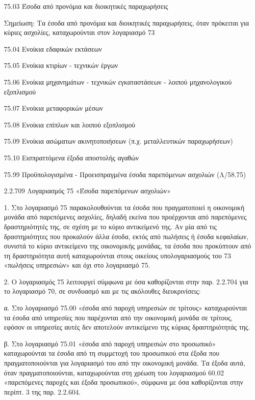 \documentclass[A4,10pt,greek]{book}
\begin{document}
         75.03    Έσοδα από προνόμια και διοικητικές παραχωρήσεις 

                      Σημείωση:  Τα έσοδα από προνόμια και διοικητικές παραχωρήσεις, όταν
                                           πρόκειται για κύριες ασχολίες, καταχωρούνται στον λογαριασμό 73

         75.04    Ενοίκια εδαφικών εκτάσεων 

         75.05    Ενοίκια κτιρίων - τεχνικών έργων 

         75.06    Ενοίκια μηχανημάτων - τεχνικών εγκαταστάσεων - λοιπού
                      μηχανολογικού εξοπλισμού 

         75.07    Ενοίκια μεταφορικών μέσων 

         75.08    Ενοίκια επίπλων και λοιπού εξοπλισμού 

         75.09    Ενοίκια ασώματων ακινητοποιήσεων
                        (π.χ. μεταλλευτικών παραχωρήσεων)

         75.10    Εισπραττόμενα έξοδα αποστολής αγαθών 

         75.99    Προϋπολογισμένα - Προεισπραγμένα έσοδα παρεπόμενων ασχολιών
                        (Λ/58.75)

2.2.709 Λογαριασμός 75 «Έσοδα παρεπόμενων ασχολιών»

1. Στο λογαριασμό 75 παρακολουθούνται τα έσοδα που πραγματοποιεί η οικονομική μονάδα από παρεπόμενες ασχολίες, δηλαδή εκείνα που προέρχονται από παρεπόμενες δραστηριότητές της, σε σχέση με το κύριο αντικείμενό της. Αν μία από τις δραστηριότητες που προκαλούν άλλα έσοδα, εκτός από πωλήσεις ή έσοδα κεφαλαίων, συνιστά το κύριο αντικείμενο της οικονομικής μονάδας, τα έσοδα που προκύπτουν από τη δραστηριότητα αυτή καταχωρούνται στους οικείους υπολογαριασμούς του 73 «πωλήσεις υπηρεσιών» και όχι στο λογαριασμό 75.

2. Ο λογαριασμός 75 λειτουργεί σύμφωνα με όσα καθορίζονται στην παρ. 2.2.704 για το λογαριασμό 70, σε συνδυασμό και με τις ακόλουθες διευκρινίσεις:

α. Στο λογαριασμό 75.00 «έσοδα από παροχή υπηρεσιών σε τρίτους» καταχωρούνται τα έσοδα από υπηρεσίες που παρέχονται από την οικονομική μονάδα σε τρίτους, εφόσον οι υπηρεσίες αυτές δεν αποτελούν αντικείμενο της κύριας δραστηριότητάς της.

β. Στο λογαριασμό 75.01 «έσοδα από παροχή υπηρεσιών στο προσωπικό» καταχωρούνται τα έσοδα από τη συμμετοχή του προσωπικού στα έξοδα που πραγματοποιούνται για λογαριασμό του από την οικονομική μονάδα. Τα έξοδα αυτά, όταν πραγματοποιούνται, καταχωρούνται στη χρέωση του λογαριασμού 60.02 «παρεπόμενες παροχές και έξοδα προσωπικού», σύμφωνα με όσα καθορίζονται στην περίπτ. 3 της παρ. 2.2.604.
\end{document}
